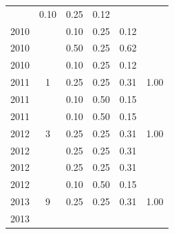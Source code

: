\begin{table}[H]
\begin{tabular}{| l | c | c | c | c | c |}
          &
          0.10
          &
          0.25
          &
          0.12
          &
          \\
            2010
          &
          
          &
          0.10
          &
          0.25
          &
          0.12
          &
          \\
            2010
          &
          
          &
          0.50
          &
          0.25
          &
          0.62
          &
          \\
            2010
          &
          
          &
          0.10
          &
          0.25
          &
          0.12
          &
          \\
\hline
            2011
          &
          1
          &
          0.25
          &
          0.25
          &
          0.31
          &
            {\color{blue} 1.00}
          \\
            2011
          &
          
          &
          0.10
          &
          0.50
          &
          0.15
          &
          \\
            2011
          &
          
          &
          0.10
          &
          0.50
          &
          0.15
          &
          \\
\hline
            2012
          &
          3
          &
          0.25
          &
          0.25
          &
          0.31
          &
            {\color{blue} 1.00}
          \\
            2012
          &
          
          &
          0.25
          &
          0.25
          &
          0.31
          &
          \\
            2012
          &
          
          &
          0.25
          &
          0.25
          &
          0.31
          &
          \\
            2012
          &
          
          &
          0.10
          &
          0.50
          &
          0.15
          &
          \\
\hline
            2013
          &
          9
          &
          0.25
          &
          0.25
          &
          0.31
          &
            {\color{blue} 1.00}
          \\
            2013
          &
          

\end{tabular}
\end{table}
